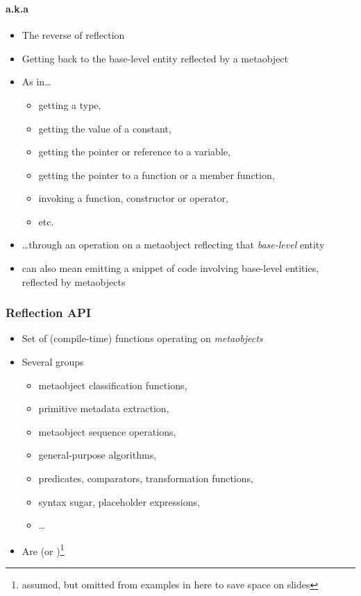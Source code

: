 \documentclass[compress,table,xcolor=table]{beamer}
\begin{document}
\begin{frame}
  \frametitle{}
  \framesubtitle{a.k.a }
  \larger
  \begin{itemize}
    \item The reverse of reflection
    \item Getting back to the base-level entity reflected by a metaobject
    \item As in\ldots
    \begin{itemize}
      \smaller
      \item getting a type,
      \item getting the value of a constant,
      \item getting the pointer or reference to a variable,
      \item getting the pointer to a function or a member function,
      \item invoking a function, constructor or operator,
      \item etc.
    \end{itemize}
    \item \ldots through an operation on a metaobject reflecting that
      {\em base-level} entity
    \item {} can also mean emitting a snippet of code involving
      base-level entities, reflected by metaobjects
  \end{itemize}
\end{frame}
\begin{frame}
  \frametitle{Reflection API}
  \larger
  \begin{itemize}
    \item Set of (compile-time) functions operating on {\em metaobjects}
    \item Several groups
    \begin{itemize}
      \item metaobject classification functions,
      \item primitive metadata extraction,
      \item metaobject sequence operations,
      \item general-purpose algorithms,
      \item predicates, comparators, transformation functions,
      \item syntax sugar, placeholder expressions,
      \item \ldots
    \end{itemize}
  \item Are  (or )\footnote{
      assumed, but omitted from examples in here to save space on slides}
  \end{itemize}
\end{frame}
\end{document}
